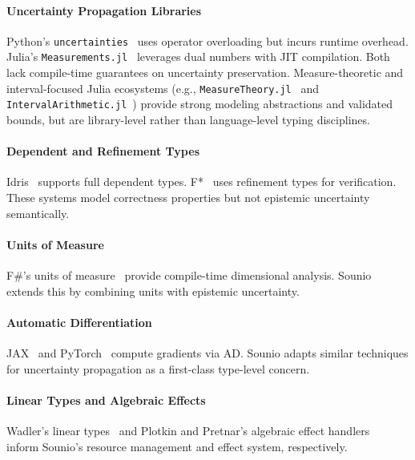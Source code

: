 \documentclass[journal]{IEEEtran}
\begin{document}
\paragraph{Uncertainty Propagation Libraries}
Python's \texttt{uncertainties}~\cite{lebigot2024uncertainties} uses
operator overloading but incurs runtime overhead. Julia's
\texttt{Measurements.jl}~\cite{giordano2016measurements} leverages dual
numbers with JIT compilation. Both lack compile-time guarantees on
uncertainty preservation. Measure-theoretic and interval-focused Julia
ecosystems (e.g., \texttt{MeasureTheory.jl}~\cite{measuretheoryjl} and
\texttt{IntervalArithmetic.jl}~\cite{intervalarithmeticjl}) provide strong
modeling abstractions and validated bounds, but are library-level rather
than language-level typing disciplines.

\paragraph{Dependent and Refinement Types}
Idris~\cite{brady2013idris} supports full dependent types. F*~\cite{swamy2016dependent}
uses refinement types for verification. These systems model correctness
properties but not epistemic uncertainty semantically.

\paragraph{Units of Measure}
F\#'s units of measure~\cite{kennedy2009units} provide compile-time
dimensional analysis. Sounio extends this by combining units with
epistemic uncertainty.

\paragraph{Automatic Differentiation}
JAX~\cite{bradbury2018jax} and PyTorch~\cite{paszke2019pytorch} compute
gradients via AD. Sounio adapts similar techniques for uncertainty
propagation as a first-class type-level concern.

\paragraph{Linear Types and Algebraic Effects}
Wadler's linear types~\cite{wadler1990linear} and Plotkin and Pretnar's
algebraic effect handlers~\cite{plotkin2009handlers} inform Sounio's
resource management and effect system, respectively.

\end{document}
